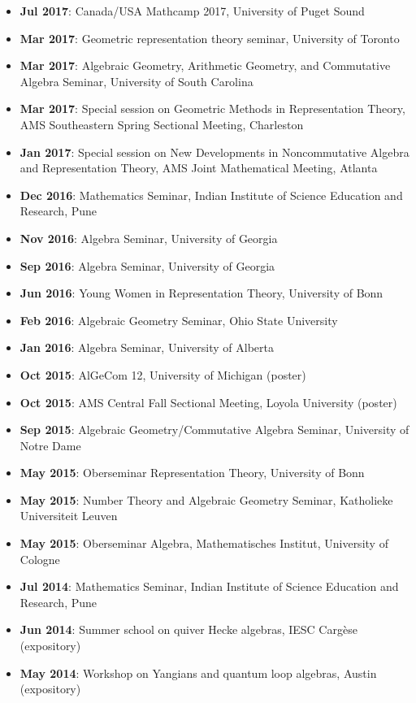\documentclass[a4paper]{moderncv}
\begin{document}
\begin{itemize}
\item \textbf{Jul 2017}: Canada/USA Mathcamp 2017, University of Puget Sound
\item \textbf{Mar 2017}: Geometric representation theory seminar, University of Toronto
\item \textbf{Mar 2017}: Algebraic Geometry, Arithmetic Geometry, and Commutative Algebra Seminar, University of South Carolina
\item \textbf{Mar 2017}: Special session on Geometric Methods in Representation Theory, AMS Southeastern Spring Sectional Meeting, Charleston
\item \textbf{Jan 2017}: Special session on New Developments in Noncommutative Algebra and Representation Theory, AMS Joint Mathematical Meeting, Atlanta
\item \textbf{Dec 2016}: Mathematics Seminar, Indian Institute of Science Education and Research, Pune
\item \textbf{Nov 2016}: Algebra Seminar, University of Georgia
\item \textbf{Sep 2016}: Algebra Seminar, University of Georgia
\item \textbf{Jun 2016}: Young Women in Representation Theory, University of Bonn
\item \textbf{Feb 2016}: Algebraic Geometry Seminar, Ohio State University
\item \textbf{Jan 2016}: Algebra Seminar, University of Alberta
\item \textbf{Oct 2015}: AlGeCom 12, University of Michigan (poster)
\item \textbf{Oct 2015}: AMS Central Fall Sectional Meeting, Loyola University (poster)
\item \textbf{Sep 2015}: Algebraic Geometry/Commutative Algebra Seminar, University of Notre Dame
\item \textbf{May 2015}: Oberseminar Representation Theory, University of Bonn
\item \textbf{May 2015}: Number Theory and Algebraic Geometry Seminar, Katholieke Universiteit Leuven
\item \textbf{May 2015}: Oberseminar Algebra, Mathematisches Institut, University of Cologne
\item \textbf{Jul 2014}: Mathematics Seminar, Indian Institute of Science Education and Research, Pune
\item \textbf{Jun 2014}: Summer school on quiver Hecke algebras, IESC Cargèse (expository)
\item \textbf{May 2014}: Workshop on Yangians and quantum loop algebras, Austin (expository)
\end{itemize}
\end{document}

